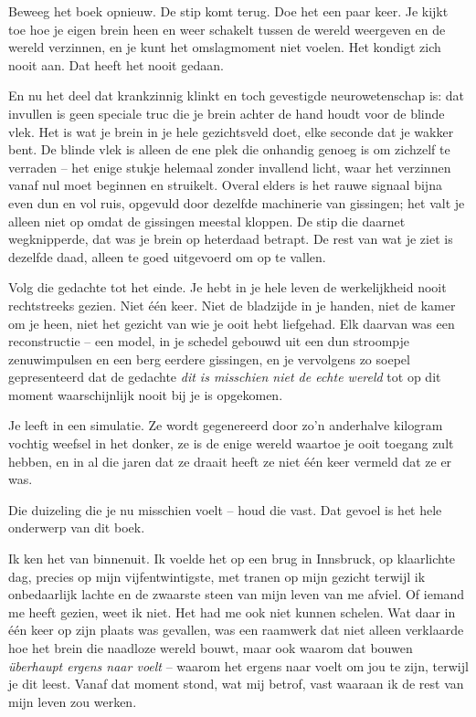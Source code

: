 \documentclass[11pt, twoside, openright]{book}
\begin{document}
Beweeg het boek opnieuw. De stip komt terug. Doe het een paar keer. Je kijkt toe hoe je eigen brein heen en weer schakelt tussen de wereld weergeven en de wereld verzinnen, en je kunt het omslagmoment niet voelen. Het kondigt zich nooit aan. Dat heeft het nooit gedaan.

En nu het deel dat krankzinnig klinkt en toch gevestigde neurowetenschap is: dat invullen is geen speciale truc die je brein achter de hand houdt voor de blinde vlek. Het is wat je brein in je hele gezichtsveld doet, elke seconde dat je wakker bent. De blinde vlek is alleen de ene plek die onhandig genoeg is om zichzelf te verraden -- het enige stukje helemaal zonder invallend licht, waar het verzinnen vanaf nul moet beginnen en struikelt. Overal elders is het rauwe signaal bijna even dun en vol ruis, opgevuld door dezelfde machinerie van gissingen; het valt je alleen niet op omdat de gissingen meestal kloppen. De stip die daarnet wegknipperde, dat was je brein op heterdaad betrapt. De rest van wat je ziet is dezelfde daad, alleen te goed uitgevoerd om op te vallen.

Volg die gedachte tot het einde. Je hebt in je hele leven de werkelijkheid nooit rechtstreeks gezien. Niet één keer. Niet de bladzijde in je handen, niet de kamer om je heen, niet het gezicht van wie je ooit hebt liefgehad. Elk daarvan was een reconstructie -- een model, in je schedel gebouwd uit een dun stroompje zenuwimpulsen en een berg eerdere gissingen, en je vervolgens zo soepel gepresenteerd dat de gedachte \textit{dit is misschien niet de echte wereld} tot op dit moment waarschijnlijk nooit bij je is opgekomen.

Je leeft in een simulatie. Ze wordt gegenereerd door zo’n anderhalve kilogram vochtig weefsel in het donker, ze is de enige wereld waartoe je ooit toegang zult hebben, en in al die jaren dat ze draait heeft ze niet één keer vermeld dat ze er was.

Die duizeling die je nu misschien voelt -- houd die vast. Dat gevoel is het hele onderwerp van dit boek.

Ik ken het van binnenuit. Ik voelde het op een brug in Innsbruck, op klaarlichte dag, precies op mijn vijfentwintigste, met tranen op mijn gezicht terwijl ik onbedaarlijk lachte en de zwaarste steen van mijn leven van me afviel. Of iemand me heeft gezien, weet ik niet. Het had me ook niet kunnen schelen. Wat daar in één keer op zijn plaats was gevallen, was een raamwerk dat niet alleen verklaarde hoe het brein die naadloze wereld bouwt, maar ook waarom dat bouwen \textit{überhaupt ergens naar voelt} -- waarom het ergens naar voelt om jou te zijn, terwijl je dit leest. Vanaf dat moment stond, wat mij betrof, vast waaraan ik de rest van mijn leven zou werken.
\end{document}
